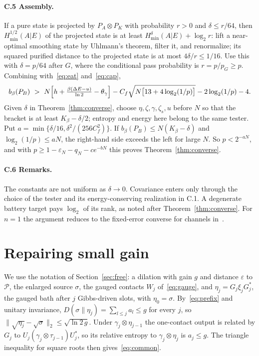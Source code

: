 \documentclass[11pt]{article}
\theoremstyle{definition}
\theoremstyle{remark}
\newcommand{\Kb}{K_\beta}
\newcommand{\Pp}{\mathcal P}
\begin{document}
\paragraph{C.5 Assembly.} If a pure state is projected by $P_A\otimes P_K$ with probability $r>0$ and $\delta\le r/64$, then $H_{\min}^{1/2}(A|E)$ of the projected state is at least $H_{\min}^\delta(A|E)+\log_2r$: lift a near-optimal smoothing state by Uhlmann's theorem, filter it, and renormalize; its squared purified distance to the projected state is at most $4\delta/r\le1/16$. Use this with $\delta=p/64$ after $G$, where the conditional pass probability is $r=p/p_G\ge p$. Combining with~\eqref{eq:eat} and~\eqref{eq:cap},
\[
b_\beta(P_B)\ >\ N\Bigl[h+\tfrac{\beta(\Delta E-u)}{\ln2}-\theta_\gamma\Bigr]-C_f\sqrt{N\bigl[13+4\log_2(1/p)\bigr]}-2\log_2(1/p)-4.
\]
Given $\delta$ in Theorem~\ref{thm:converse}, choose $\eta,\zeta,\gamma,\zeta_s,u$ before $N$ so that the bracket is at least $\Kb-\delta/2$; entropy and energy here belong to the same tester. Put $a=\min\{\delta/16,\delta^2/(256C_f^2)\}$. If $b_\beta(P_B)\le N(\Kb-\delta)$ and $\log_2(1/p)\le aN$, the right-hand side exceeds the left for large $N$. So $p<2^{-aN}$, and with $p\ge1-\varepsilon_N-q_N-ce^{-bN}$ this proves Theorem~\ref{thm:converse}.

\paragraph{C.6 Remarks.} The constants are not uniform as $\delta\to0$. Covariance enters only through the choice of the tester and its energy-conserving realization in C.1. A degenerate battery target pays $\log_2$ of its rank, as noted after Theorem~\ref{thm:converse}. For $n=1$ the argument reduces to the fixed-error converse for channels in~\cite{SaveWork}.

\section{Repairing small gain}\label{app:free}

We use the notation of Section~\ref{sec:free}: a dilation with gain $g$ and distance $\varepsilon$ to $\Pp$, the enlarged source $\sigma$, the gauged contacts $W_j$ of~\eqref{eq:gauge}, and $\eta_j=G_j\xi_jG_j^*$, the gauged bath after $j$ Gibbs-driven slots, with $\eta_0=\sigma$. By~\eqref{eq:prefix} and unitary invariance, $D(\sigma\|\eta_j)=\sum_{l\le j}a_l\le g$ for every $j$, so $\|\sqrt{\eta_j}-\sqrt\sigma\|_2\le\sqrt{\ln2\,g}$. Under $\gamma_j\otimes\eta_{j-1}$ the one-contact output is related by $G_j$ to $U_j(\gamma_j\otimes\tau_{j-1})U_j^*$, so its relative entropy to $\gamma_j\otimes\eta_j$ is $a_j\le g$. The triangle inequality for square roots then gives~\eqref{eq:common}.
\end{document}
